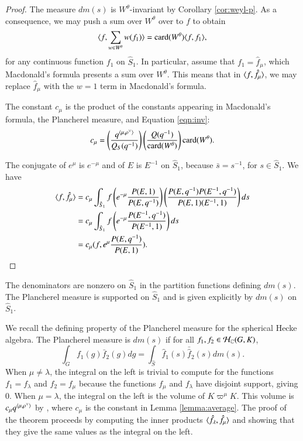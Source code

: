 \begin{proof}  
The  measure $dm(s)$ is $W^\theta$-invariant by Corollary \ref{cor:weyl-p}.  As a consequence,
we may push a sum over $W^\theta$ over to $f$ to obtain
\begin{equation}\label{eqn:inv}
\langle{f,\sum_{w\in W^\theta} w(f_1)}\rangle = {\operatorname{card}}(W^\theta)\langle{f,f_1}\rangle,
\end{equation}
for any continuous function $f_1$ on $\hat S_1$.
In particular, assume that $f_1=\hat f_\mu$, which Macdonald's
formula presents a sum over $W^\theta$.
This means that in $\langle{f,\hat f_\mu}\rangle$, we may replace 
$\hat f_\mu$  with
the $w=1$ term  in Macdonald's formula.

The constant $c_\mu$ is the product of the constants appearing in Macdonald's formula, the Plancherel measure,
and Equation \ref{eqn:inv}:
\[
c_\mu = \left(\frac{q^{\langle{\mu,\rho^\vee}\rangle}}{Q_S(q^{-1})}\right)\left(\frac{Q(q^{-1})}{{\operatorname{card}}(W^\theta)}\right) {\operatorname{card}}(W^\theta).
\]

The conjugate of $e^\mu$ is $e^{-\mu}$ and of $E$ is $E^{-1}$ on $\hat S_1$, because $\bar s = s^{-1}$, for $s\in \hat S_1$.
We have
\begin{align*}
\langle{f,\hat f_\mu}\rangle &=
c_\mu\int_{\hat S_1} f \left(e^{-\mu} \frac{P(E,1)}{P(E,q^{-1})}\right) \left(\frac{P(E,q^{-1}) P(E^{-1},q^{-1})}{P(E,1)(E^{-1},1)}\right) ds\\
&=
c_\mu\int_{\hat S_1} f \left(e^{-\mu} \frac{P(E^{-1},q^{-1})}{P(E^{-1},1)}\right) ds\\
&=
c_\mu (f, e^\mu\frac{ P(E,q^{-1})}{P(E,1)}).
\end{align*}
\end{proof}

\begin{theorem}
The denominators are nonzero on $\hat S_1$ in the partition functions defining 
$dm(s)$. 
The Plancherel measure is supported on $\hat S_1$ and is given explicitly by $dm(s)$ on $\hat S_1$.
\end{theorem}

\begin{remark}
We recall the defining property of the Plancherel measure
for the spherical Hecke algebra.  The Plancherel measure  is $dm(s)$  if
for all $f_1,f_2\in \mathcal H_{\mathbb{C}}(G,K)$,
\[
\int_G f_1(g) \bar f_2 (g) dg = \int_{\hat S} \hat f_1(s) \bar {\hat f}_2 (s) dm(s).
\]
When $\mu\ne\lambda$,
the integral on the left is trivial to compute for the functions $f_1 = f_\lambda$ and $f_2 = f_\mu$
because the functions $f_\mu$ and $f_\lambda$ have disjoint support, giving $0$.
When $\mu=\lambda$, the integral on the left is the volume of $K\varpi^\mu K$.
This volume is $c_\mu q^{\langle{\mu,\rho^\vee}\rangle}$ by \cite{casselman2005companion}, where $c_\mu$ is
the constant in Lemma \ref{lemma:average}.
The proof of the theorem proceeds by computing the inner products $\langle{\hat f_\lambda,\hat f_\mu}\rangle$
and showing that they give the same values as the integral on the left.
\end{remark}


